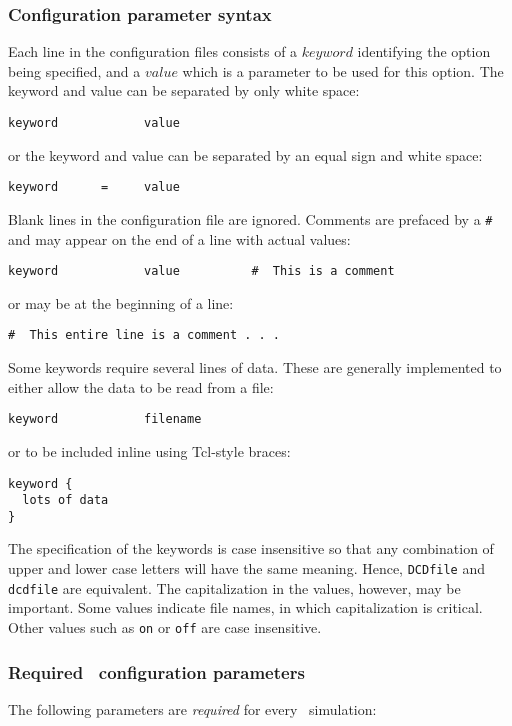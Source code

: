 \subsubsection{Configuration parameter syntax}
\label{section:configsyntax}
Each line
in the configuration files consists of a $keyword$ identifying the option
being specified, and a $value$ which is a parameter to be used for this
option.  The keyword and value can be separated by only white space:
\begin{verbatim}
keyword            value
\end{verbatim}
or the keyword and value can be separated by an equal sign and white space:
\begin{verbatim}
keyword      =     value
\end{verbatim}
Blank lines in the configuration file are ignored.  Comments are prefaced by
a \verb!#! and may appear on the end of a line with actual values:
\begin{verbatim}
keyword            value          #  This is a comment
\end{verbatim}
or may be at the beginning of a line:
\begin{verbatim}
#  This entire line is a comment . . . 
\end{verbatim}
Some keywords require several lines of data.
These are generally implemented to either allow the data to be read from a file:
\begin{verbatim}
keyword            filename
\end{verbatim}
or to be included inline using Tcl-style braces:
\begin{verbatim}
keyword {
  lots of data
}
\end{verbatim}

The specification of the keywords is case insensitive 
so that any combination of 
upper and lower case letters will have the same meaning.  
Hence, {\tt DCDfile} and {\tt dcdfile} 
are equivalent.  The capitalization in the values, however, may be important.
Some values indicate file names, in which capitalization is critical.  
Other values such as {\tt on} or {\tt off} are case insensitive.

\subsubsection{Required \NAMD\ configuration parameters}
\label{section:configparams}

The following parameters are {\em required} for every
\NAMD\ simulation:

